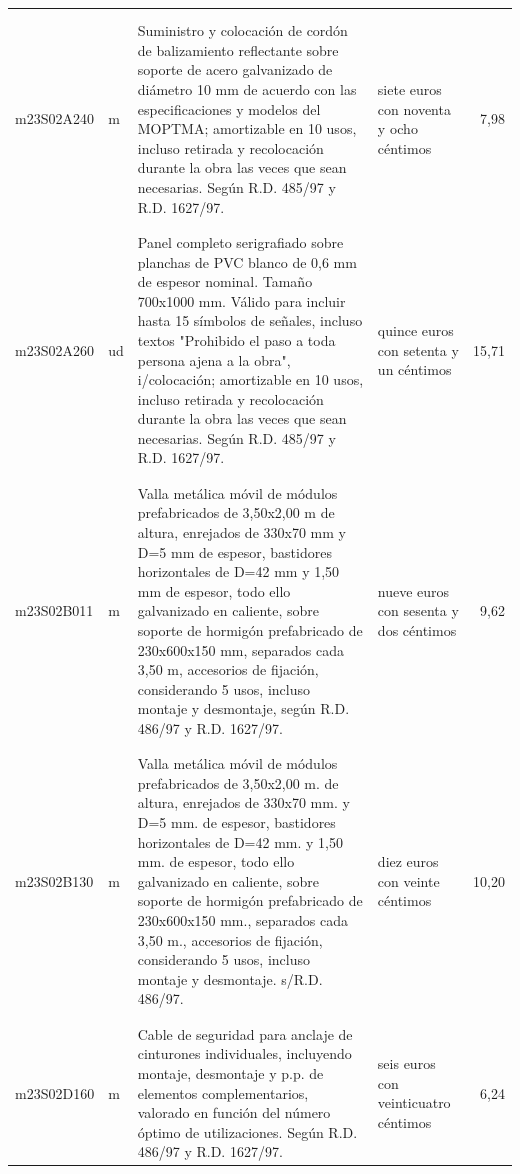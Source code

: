 \documentclass{book}%
\begin{document}
\begin{longtable}{|l|l|p{5cm}|p{3cm}|r|}
&&&&\\%
&&&&\\%
m23S02A240&m&Suministro y colocación de cordón de balizamiento reflectante sobre soporte de acero galvanizado de diámetro 10 mm de acuerdo con las especificaciones y modelos del MOPTMA; amortizable en 10 usos, incluso retirada y recolocación durante la obra las veces que sean necesarias. Según R.D. 485/97 y R.D. 1627/97.&siete euros con noventa y ocho céntimos&7,98\\%
&&&&\\%
&&&&\\%
m23S02A260&ud&Panel completo serigrafiado sobre planchas de PVC blanco de 0,6 mm de espesor nominal. Tamaño 700x1000 mm. Válido para incluir hasta 15 símbolos de señales, incluso textos "Prohibido el paso a toda persona ajena a la obra", i/colocación; amortizable en 10 usos, incluso retirada y recolocación durante la obra las veces que sean necesarias. Según R.D. 485/97 y R.D. 1627/97.&quince euros con setenta y un céntimos&15,71\\%
&&&&\\%
&&&&\\%
m23S02B011&m&Valla metálica móvil de módulos prefabricados de 3,50x2,00 m de altura, enrejados de 330x70 mm y D=5 mm de espesor, bastidores horizontales de D=42 mm y 1,50 mm de espesor, todo ello galvanizado en caliente, sobre soporte de hormigón prefabricado de 230x600x150 mm, separados cada 3,50 m, accesorios de fijación, considerando 5 usos, incluso montaje y desmontaje, según R.D. 486/97 y R.D. 1627/97.&nueve euros con sesenta y dos céntimos&9,62\\%
&&&&\\%
&&&&\\%
m23S02B130&m&Valla metálica móvil de módulos prefabricados de 3,50x2,00 m. de altura, enrejados de 330x70 mm. y D=5 mm. de espesor, bastidores horizontales de D=42 mm. y 1,50 mm. de espesor, todo ello galvanizado en caliente, sobre soporte de hormigón prefabricado de 230x600x150 mm., separados cada 3,50 m., accesorios de fijación, considerando 5 usos, incluso montaje y desmontaje. s/R.D. 486/97.&diez euros con veinte céntimos&10,20\\%
&&&&\\%
&&&&\\%
m23S02D160&m&Cable de seguridad para anclaje de cinturones individuales, incluyendo montaje, desmontaje y p.p. de elementos complementarios, valorado en función del número óptimo de utilizaciones. Según R.D. 486/97 y R.D. 1627/97.&seis euros con veinticuatro céntimos&6,24\\%

\end{longtable}
\end{document}
